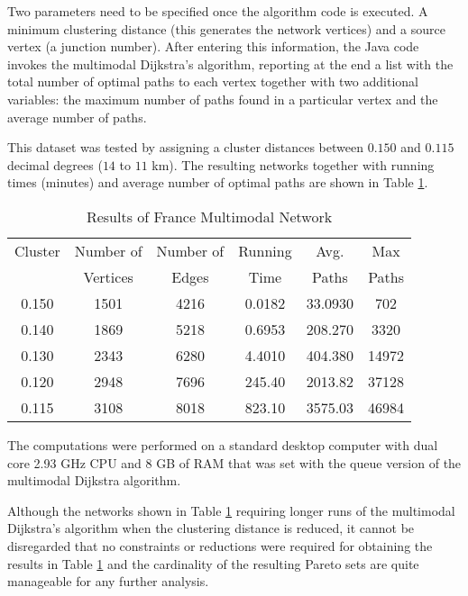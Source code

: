 \documentclass[preprint,authoryear,12pt]{elsarticle}
\begin{document}
Two parameters need to be specified once the algorithm code is executed. 
A minimum clustering distance (this generates the network vertices)
and a source vertex (a junction number). After entering this information,
the Java code invokes the multimodal Dijkstra's algorithm, reporting at
the end a list with the total number of optimal paths to each vertex
together with two additional variables: the maximum number of paths found
in a particular vertex and the average number of paths.

This dataset was tested by assigning a cluster distances between $0.150$ and $0.115$
decimal degrees ($14$ to $11$ km). The resulting networks together with running times
(minutes) and average number of optimal paths are shown in Table \ref{FranceResults}.
\begin{table}
\caption{Results of France Multimodal Network}\label{FranceResults}
\vspace{-0.1cm}
\begin{center}
\begin{tabular}{cccccc}\hline
  Cluster  &  Number of & Number of & Running & Avg.    & Max                \\
           &  Vertices  & Edges     & Time    & Paths   & Paths              \\ \hline 
  0.150    &  1501      & 4216      & 0.0182   & 33.0930  & 702              \\
  0.140    &  1869      & 5218      & 0.6953   & 208.270  & 3320               \\
  0.130    &  2343      & 6280      & 4.4010   & 404.380  & 14972                \\
  0.120    &  2948      & 7696      & 245.40   & 2013.82  & 37128                  \\
  0.115    &  3108      & 8018      & 823.10   & 3575.03  & 46984                 \\
   \hline
\end{tabular}
\end{center}
\label{FranceResults}
\end{table}
The computations were performed on a standard desktop computer with dual core
2.93 GHz CPU and 8 GB of RAM that was set with the queue version of the
multimodal Dijkstra algorithm.

Although the networks shown in Table \ref{FranceResults} requiring longer
runs of the multimodal Dijkstra's algorithm when the clustering distance
is reduced, it cannot be disregarded that no constraints or reductions were
required for obtaining the results in Table \ref{FranceResults} and the
cardinality of the resulting Pareto sets are quite manageable for any
further analysis.  
\end{document}

